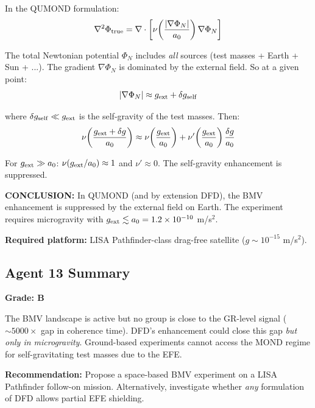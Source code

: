 \documentclass[11pt,a4paper]{article}
\begin{document}
In the QUMOND formulation:
\begin{equation}
\nabla^2\Phi_{\rm true} = \nabla\cdot\left[\nu\!\left(\frac{|\nabla\Phi_N|}{a_0}\right)\nabla\Phi_N\right]
\end{equation}

The total Newtonian potential $\Phi_N$ includes \emph{all} sources (test masses + Earth + Sun + ...). The gradient $\nabla\Phi_N$ is dominated by the external field. So at a given point:
\begin{equation}
|\nabla\Phi_N| \approx g_{\rm ext} + \delta g_{\rm self}
\end{equation}

where $\delta g_{\rm self} \ll g_{\rm ext}$ is the self-gravity of the test masses. Then:
\begin{equation}
\nu\!\left(\frac{g_{\rm ext} + \delta g}{a_0}\right) \approx \nu\!\left(\frac{g_{\rm ext}}{a_0}\right) + \nu'\!\left(\frac{g_{\rm ext}}{a_0}\right)\frac{\delta g}{a_0}
\end{equation}

For $g_{\rm ext} \gg a_0$: $\nu(g_{\rm ext}/a_0) \approx 1$ and $\nu' \approx 0$. The self-gravity enhancement is suppressed.

\textbf{CONCLUSION:} In QUMOND (and by extension DFD), the BMV enhancement is suppressed by the external field on Earth. The experiment requires microgravity with $g_{\rm ext} \lesssim a_0 = 1.2\times10^{-10}$ m/s$^2$.

\textbf{Required platform:} LISA Pathfinder-class drag-free satellite ($g \sim 10^{-15}$ m/s$^2$).

\subsection{Agent 13 Summary}

\textbf{Grade: B}

The BMV landscape is active but no group is close to the GR-level signal ($\sim 5000\times$ gap in coherence time). DFD's enhancement could close this gap \emph{but only in microgravity}. Ground-based experiments cannot access the MOND regime for self-gravitating test masses due to the EFE.

\textbf{Recommendation:} Propose a space-based BMV experiment on a LISA Pathfinder follow-on mission. Alternatively, investigate whether \emph{any} formulation of DFD allows partial EFE shielding.

\end{document}
